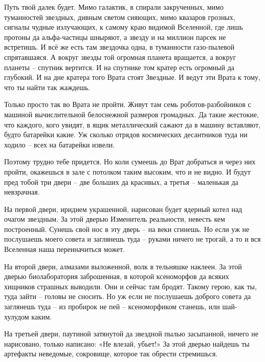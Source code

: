 \documentclass[ebook,oneside,final,openright]{memoir}
\begin{document}
\par
Путь твой далек будет. Мимо галактик, в спирали закрученных, мимо туманностей звездных, дивным светом сияющих, мимо квазаров грозных, сигналы чудные излучающих, к самому краю видимой Вселенной, где лишь протоны да альфа-частицы шныряют, а звезду и на миллион парсек не встретишь. И всё же есть там звездочка одна, в туманности газо-пылевой спрятавшаяся. А вокруг звезды той огромная планета вращается, а вокруг планеты – спутник вертится. И на спутнике том кратер есть огромный да глубокий. И на дне кратера того Врата стоят Звездные. И ведут эти Врата к тому, что ты найти так жаждешь.\par
\par
Только просто так во Врата не пройти. Живут там семь роботов-разбойников с машиной вычислительной белоснежной размеров громадных. Да такие жестокие, что каждого, кого увидят, в ящик металлический сажают да в машину вставляют, будто батарейки какие. Уж сколько отрядов космических десантников туда ни ходило – всех на батарейки извели.\par
\par
Поэтому трудно тебе придется. Но коли сумеешь до Врат добраться и через них пройти, окажешься в зале с потолком таким высоким, что и не видно. И будут пред тобой три двери – две больших да красивых, а третья – маленькая да невзрачная.\par
\par
На первой двери, иридием украшенной, нарисован будет ядерный котел над очагом звездным. За этой дверью Изменитель реальности, невесть кем построенный. Сунешь свой нос в эту дверь – на веки сгинешь. Но если уж не послушаешь моего совета и заглянешь туда – руками ничего не трогай, а то и вся Вселенная наша переиначиться может.\par
\par
На второй двери, алмазами выложенной, волк в тельняшке наклеен. За этой дверью биолаборатория заброшенная, в которой ксеноморфов да всяких хищников страшных выводили. Они и сейчас там бродят. Такому герою, как ты, туда зайти – головы не сносить. Но уж если не послушаешь доброго совета да заглянешь туда – из пробирок не пей – ксеноморфиком станешь, или шай-хулудом каким.\par
\par
На третьей двери, паутиной затянутой да звездной пылью засыпанной, ничего не нарисовано, только написано: «Не влезай, убьет!» За этой дверью найдешь ты артефакты неведомые, сокровище, которое так обрести стремишься.\par
\end{document}
